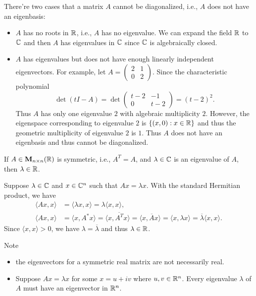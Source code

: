     \begin{remarkenv}
        There're two cases that a matrix $A$ cannot be diagonalized, i.e., $A$ does not have an eigenbasis:
        \begin{itemize}
            \item $A$ has no roots in $\mathbb{R}$, i.e., $A$ has no eigenvalue. We can expand the field $\mathbb{R}$ to $\mathbb{C}$ and then $A$ has eigenvalues in $\mathbb{C}$ since $\mathbb{C}$ is algebraically closed.
            \item $A$ has eigenvalues but does not have enough linearly independent eigenvectors. For example, let $\displaystyle A=\begin{pmatrix}
            2 & 1\\
            0 & 2
            \end{pmatrix}.$ Since the characteristic polynomial $$\det(tI-A)=\det\begin{pmatrix}
            t-2 & -1\\
            0 & t-2
            \end{pmatrix}
            =(t-2)^2.$$ Thus $A$ has only one eigenvalue $2$ with algebraic multiplicity $2$. However, the eigenspace corresponding to eigenvalue $2$ is $\{(x,0): x\in \mathbb{R}\}$ and thus the geometric multiplicity of eigenvalue $2$ is $1$. Thus $A$ does not have an eigenbasis and thus cannot be diagonalized.
        \end{itemize}

    \end{remarkenv}
    \begin{theoremenv}\label{thm: eigenvalue of symmetric matrix is real}
        If $A\in \mathbf{M}_{n\times n}(\mathbb{R})$ is symmetric, i.e., $A^T = A$, and $\lambda \in \mathbb{C}$ is an eigenvalue of $A$, then $\lambda \in \mathbb{R}$.
    \end{theoremenv}
    \begin{proofenv}
        Suppose $\lambda \in \mathbb{C}$ and $x\in \mathbb{C} ^n$ such that $A x = \lambda x$. With the standard Hermitian product, we have
        \[
        \begin{aligned}
            \langle A x, x \rangle &= \langle \lambda x, x \rangle = \lambda \langle x, x \rangle,\\
            \langle A x, x \rangle &= \langle x, A^* x \rangle = \langle x, \overline{A^T} x \rangle = \langle x, \overline{A} x \rangle=  \langle x, \lambda x \rangle = \overline{\lambda} \langle x, x \rangle.
        \end{aligned}
        \]
        Since $\langle x, x \rangle > 0$, we have $\lambda = \overline{\lambda}$ and thus $\lambda \in \mathbb{R}$.
    \end{proofenv}
    \begin{remarkenv}
        Note
        \begin{itemize}
            \item the eigenvectors for a symmetric real matrix are not necessarily real.
            \item Suppose $Ax = \lambda x$ for some $x=u+iv$ where $u,v\in \mathbb{R}^n$. Every eigenvalue $\lambda$ of $A$ must have an eigenvector in $\mathbb{R}^n$.
        \end{itemize}
    \end{remarkenv}
